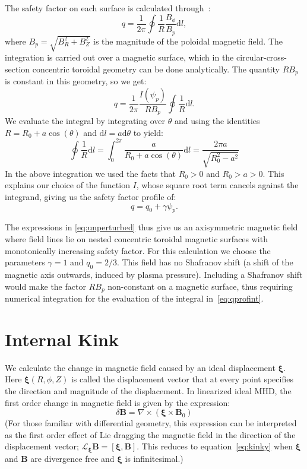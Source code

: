 \documentclass[%
superscriptaddress,
amsmath,amssymb,
aps,
pre,
floatfix,
]{revtex4-2}
\begin{document}
The safety factor on each surface is calculated through~\cite{wesson2011tokamaks}:
\begin{equation}\label{eq:qprofint}
  q=\frac{1}{2\pi} \oint \frac{1}{R}\frac{B_\phi}{B_p}\mathrm{d} l,
\end{equation}
where $B_p=\sqrt{B_R^2+B_Z^2}$ is the magnitude of the poloidal magnetic field.
The integration is carried out over a magnetic surface, which in the circular-cross-section concentric toroidal geometry can be done analytically.
The quantity $R B_p$ is constant in this geometry, so we get:
\begin{equation}
  q = \frac{1}{2\pi} \frac{I(\psi_p)}{RB_p}\oint \frac{1}{R} \mathrm{d}l.
\end{equation}
We evaluate the integral by integrating over $\theta$ and using the identities $R=R_0 +a \cos(\theta)$ and $\mathrm{d}l = a \mathrm{d}\theta$ to yield:
\begin{equation}
  \oint \frac{1}{R} \mathrm{d}l = \int_0^{2\pi} \frac{a}{R_0 + a \cos(\theta)} \mathrm{d}l =
  \frac{2\pi a}{\sqrt{R_0^2 -a^2}}
\end{equation}
In the above integration we used the facts that $R_0>0$ and $R_0>a>0$.
This explains our choice of the function $I$, whose square root term cancels against the integrand, giving us the safety factor profile of:
\begin{equation}
  q=q_0 + \gamma \psi_p.
\end{equation}

The expressions in \ref{eq:unperturbed} thus give us an axisymmetric magnetic field where field lines lie on nested concentric toroidal magnetic surfaces with monotonically increasing safety factor.
For this calculation we choose the parameters $\gamma=1$ and $q_0=2/3$.
This field has no Shafranov shift (a shift of the magnetic axis outwards, induced by plasma pressure).
Including a Shafranov shift would make the factor $RB_p$ non-constant on a magnetic surface, thus requiring numerical integration for the evaluation of the integral in~\eqref{eq:qprofint}.

\section*{Internal Kink}
We calculate the change in magnetic field caused by an ideal displacement $\boldsymbol{\xi}$. 
Here $\boldsymbol{\xi}(R, \phi, Z)$ is called the displacement vector that at every point specifies the direction and magnitude of the displacement. 
In linearized ideal MHD, the first order change in magnetic field is given by the expression: 
\begin{equation}\label{eq:kinky}
    \delta \mathbf{B} = \nabla \times (\boldsymbol{\xi} \times \mathbf{B}_0)
\end{equation}
(For those familiar with differential geometry, this expression can be interpreted as the first order effect of Lie dragging the magnetic field in the direction of the displacement vector; $\mathcal{L}_{\boldsymbol{\xi}} \mathbf{B} = \left[\boldsymbol{\xi}, \mathbf{B}\right]$. This reduces to equation~\eqref{eq:kinky} when $\boldsymbol{\xi}$ and $\mathbf{B}$ are divergence free and $\boldsymbol{\xi}$ is infinitesimal.)
\end{document}
